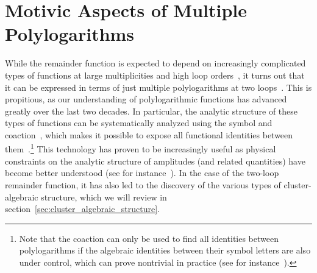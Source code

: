 \documentclass[11pt]{article}
\begin{document}
\section{Motivic Aspects of Multiple Polylogarithms}
\label{sec:motivic_aspects_polylogs}

While the remainder function is expected to depend on increasingly complicated types of functions at large multiplicities and high loop orders~\cite{Paulos:2012nu,CaronHuot:2012ab,Nandan:2013ip,Chicherin:2017bxc,Bourjaily:2017bsb,Bourjaily:2018ycu,Bourjaily:2018yfy,Bourjaily:2019hmc}, it turns out that it can be expressed in terms of just multiple polylogarithms at two loops~\cite{CaronHuot:2011ky}. This is propitious, as our understanding of polylogarithmic functions has advanced greatly over the last two decades. In particular, the analytic structure of these types of functions can be systematically analyzed using the symbol and coaction~\cite{Goncharov:2001iea,Brown:2009qja,Goncharov:2010jf,Brown1102.1312,Brown:2015fyf}, which makes it possible to expose all functional identities between them~\cite{Goncharov:2005sla,2011arXiv1101.4497D,Brown:2011ik,Duhr:2011zq,Duhr:2012fh}.\footnote{Note that the coaction can only be used to find all identities between polylogarithms if the algebraic identities between their symbol letters are also under control, which can prove nontrivial in practice (see for instance~\cite{Bourjaily:2019igt}).} This technology has proven to be increasingly useful as physical constraints on the analytic structure of amplitudes (and related quantities) have become better understood (see for instance~\cite{Bloch:2010gk,Abreu:2014cla,Bloch:2015efx,Abreu:2017ptx,Caron-Huot:2019bsq,Bourjaily:2019exo,Bourjaily:2020wvq,Benincasa:2020aoj}). In the case of the two-loop remainder function, it has also led to the discovery of the various types of cluster-algebraic structure, which we will review in section~\ref{sec:cluster_algebraic_structure}. 

\end{document}
